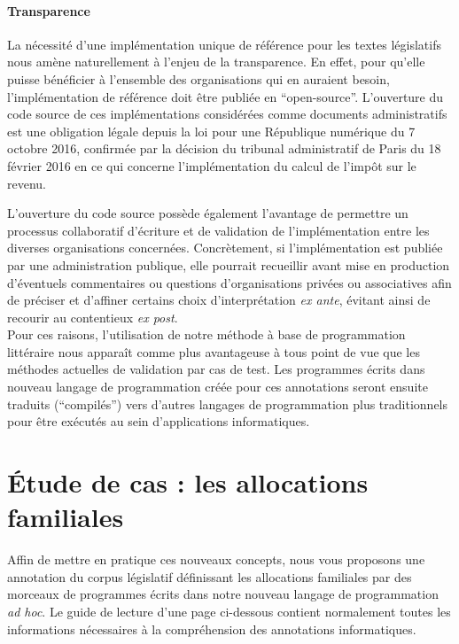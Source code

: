 \documentclass[11pt, french]{article}
\begin{document}
\paragraph{Transparence} La nécessité d'une implémentation unique de référence pour les textes
législatifs nous amène naturellement à l'enjeu de la transparence. En effet, pour qu'elle puisse
bénéficier à l'ensemble des organisations qui en auraient besoin, l'implémentation de référence doit
être publiée en \enquote{open-source}. L'ouverture du code source de ces implémentations considérées
comme documents administratifs est
une obligation légale depuis la loi pour une République numérique du 7 octobre 2016, confirmée
par la décision du tribunal administratif de Paris du 18 février 2016 en ce qui concerne l'implémentation
du calcul de l'impôt sur le revenu.

L'ouverture du code source possède également l'avantage de permettre un processus collaboratif
d'écriture et de validation de l'implémentation entre les diverses organisations concernées.
Concrètement, si l'implémentation est publiée par une administration publique, elle pourrait
recueillir avant mise en production d'éventuels commentaires ou questions d'organisations privées
ou associatives afin de préciser et d'affiner certains choix d'interprétation \emph{ex ante},
évitant ainsi de recourir au contentieux \emph{ex post}.\\

Pour ces raisons, l'utilisation de notre méthode à base de programmation littéraire nous apparaît
comme plus avantageuse à tous point de vue que les méthodes actuelles de validation par cas de
test. Les programmes écrits dans nouveau langage de programmation créée pour ces annotations seront
ensuite traduits
(\enquote{compilés}) vers d'autres langages de programmation plus traditionnels
pour être exécutés au sein d'applications informatiques.

\section{Étude de cas : les allocations familiales}

Affin de mettre en pratique ces nouveaux concepts, nous vous proposons une annotation du corpus
législatif définissant les allocations familiales par des morceaux de programmes écrits dans
notre nouveau langage de programmation \emph{ad hoc}. Le guide de lecture d'une page ci-dessous
contient normalement toutes les informations nécessaires à la compréhension des annotations 
informatiques.
\end{document}
